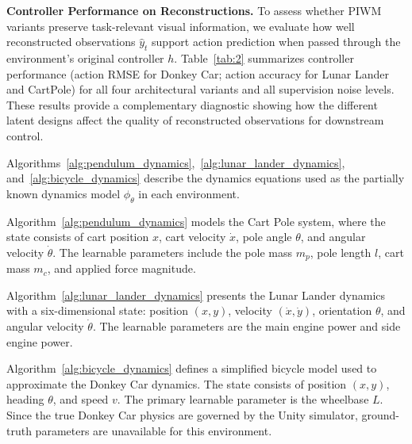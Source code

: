\documentclass[nonacm,sigconf]{acmart}
\begin{document}
\textbf{Controller Performance on Reconstructions.}
To assess whether PIWM variants preserve task-relevant visual information, we
evaluate how well reconstructed observations $\hat{y}_{t}$ support action
prediction when passed through the environment’s original controller $h$.  
Table~\ref{tab:2} summarizes controller performance (action RMSE
for Donkey Car; action accuracy for Lunar Lander and CartPole) for all four
architectural variants and all supervision noise levels.  
These results provide a complementary diagnostic showing how the different
latent designs affect the quality of reconstructed observations for downstream
control.



Algorithms~\ref{alg:pendulum_dynamics},~\ref{alg:lunar_lander_dynamics}, and~\ref{alg:bicycle_dynamics} describe the dynamics equations used as the partially known dynamics model $\phi_\theta$ in each environment.

Algorithm~\ref{alg:pendulum_dynamics} models the Cart Pole system, where the state consists of cart position $x$, cart velocity $\dot{x}$, pole angle $\theta$, and angular velocity $\dot{\theta}$. The learnable parameters include the pole mass $m_p$, pole length $l$, cart mass $m_c$, and applied force magnitude.

Algorithm~\ref{alg:lunar_lander_dynamics} presents the Lunar Lander dynamics with a six-dimensional state: position $(x, y)$, velocity $(\dot{x}, \dot{y})$, orientation $\theta$, and angular velocity $\dot{\theta}$. The learnable parameters are the main engine power and side engine power.

Algorithm~\ref{alg:bicycle_dynamics} defines a simplified bicycle model used to approximate the Donkey Car dynamics. The state consists of position $(x, y)$, heading $\theta$, and speed $v$. The primary learnable parameter is the wheelbase $L$. Since the true Donkey Car physics are governed by the Unity simulator, ground-truth parameters are unavailable for this environment.
\end{document}
